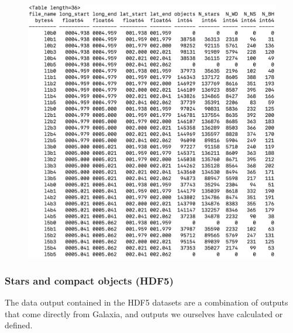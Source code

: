\documentclass{scrartcl}
\begin{document}
\begin{figure}[h]
    \centering
    \includegraphics[scale=0.3]{fits.png}
\end{figure}

\newpage 

\subsubsection{Stars and compact objects (HDF5)}

The data output contained in the HDF5 datasets are a combination of outputs that come directly from Galaxia, and outputs we ourselves have calculated or defined.
\end{document}
